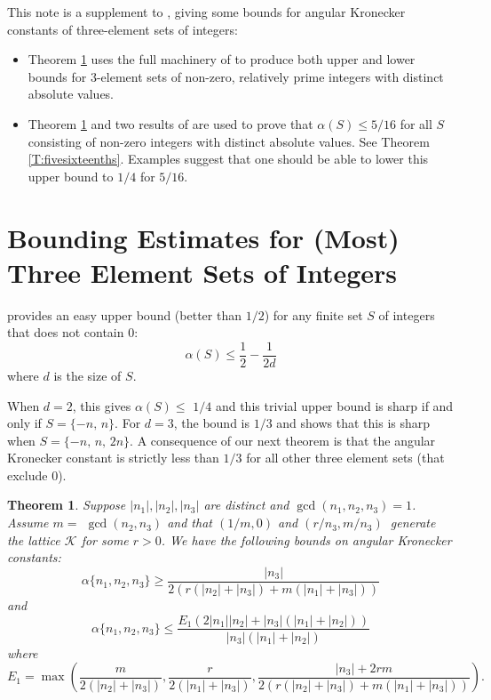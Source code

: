 \documentclass{amsart}
\newtheorem{theorem}{Theorem}
\begin{document}
This note is a supplement to \cite{HR}, giving some bounds for angular Kronecker constants of three-element sets of integers:
\begin{itemize}
\item
Theorem \ref{upperlowerbound} uses the full machinery of \cite{HR} to produce both upper and lower bounds for 3-element sets of non-zero, relatively prime integers with distinct absolute values.
\item
Theorem \ref{upperlowerbound} and two results of \cite{HR} are used to prove that $\alpha(S) \le 5/16$ for all $S$ consisting of non-zero integers with distinct absolute values.  See Theorem \ref{T:fivesixteenths}.  Examples suggest that one should be able to lower this upper bound to $1/4$ for $5/16$.
\end{itemize}

\section{Bounding Estimates for (Most) Three Element Sets of Integers}

\cite{HR} provides an easy upper bound (better than $1/2$) for any finite set $S$ of integers that
does not contain $0$:  
$$
\alpha(S) \le \dfrac 1 2 -\dfrac 1 {2d}
$$
where $d$ is the size of $S$.

When $d=2$, this gives $\alpha (S)\leq $ $1/4$ and this trivial upper bound
is sharp if and only if $S=\{-n,\,n\}$. For $d=3$, the bound is $1/3$ and
\cite{HR} shows that this is sharp when $S=\{-n,\,n,\,2n\}.$ A
consequence of our next theorem is that the angular Kronecker constant is
strictly less than $1/3$ for all other three element sets (that exclude $0$).

\begin{theorem}
\label{upperlowerbound}Suppose $\left\vert n_{1}\right\vert ,\left\vert
n_{2}\right\vert ,\left\vert n_{3}\right\vert $ are distinct and $\gcd
(n_{1},n_{2},n_{3})=1$. Assume $m=$ $\gcd (n_{2},n_{3})$ and that $(1/m,0)$
and $(r/n_{3},m/n_{3})$ $\ $generate the lattice $\mathcal{K}$ for some $r>0$. We have the following bounds on angular Kronecker constants:
$$
\alpha \{n_{1},n_{2},n_{3}\}\geq \frac{\left\vert n_{3}\right\vert }{2(r(\left\vert n_{2}\right\vert +\left\vert n_{3}\right\vert )+m(\left\vert
n_{1}\right\vert +\left\vert n_{3}\right\vert ))}
$$
and$$
\alpha \{n_{1},n_{2},n_{3}\}\leq \frac{E_{1}\left( 2\left\vert
n_{1}\right\vert \left\vert n_{2}\right\vert +\left\vert n_{3}\right\vert
(\left\vert n_{1}\right\vert +\left\vert n_{2}\right\vert )\right) }{\left\vert n_{3}\right\vert (\left\vert n_{1}\right\vert +\left\vert
n_{2}\right\vert )}
$$
where
$$
E_{1}=\max \left( \frac{m}{2(\left\vert n_{2}\right\vert +\left\vert
n_{3}\right\vert )},\frac{r}{2(\left\vert n_{1}\right\vert +\left\vert
n_{3}\right\vert )},\frac{\left\vert n_{3}\right\vert +2rm}{2\left(
r(\left\vert n_{2}\right\vert +\left\vert n_{3}\right\vert )+m(\left\vert
n_{1}\right\vert +\left\vert n_{3}\right\vert )\right) }\right) .
$$
\end{theorem}
\end{document}
